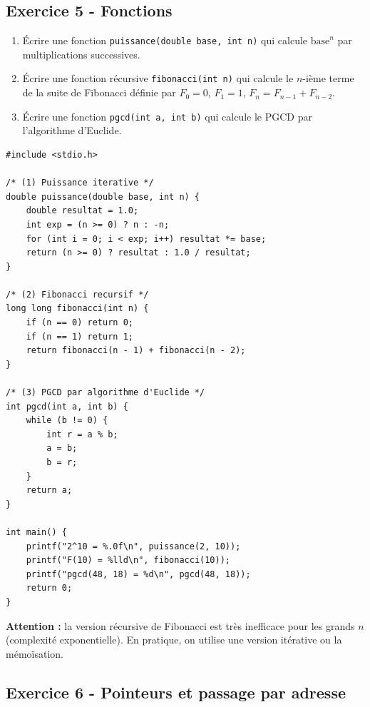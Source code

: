\documentclass[12pt,a4paper]{article}
\begin{document}
\subsection*{Exercice 5 - Fonctions \niveau{\moyen}}

\begin{boiteexercice}
\begin{enumerate}
  \item Écrire une fonction \texttt{puissance(double base, int n)} qui calcule $\text{base}^n$ par multiplications successives.
  \item Écrire une fonction récursive \texttt{fibonacci(int n)} qui calcule le $n$-ième terme de la suite de Fibonacci définie par $F_0=0$, $F_1=1$, $F_n=F_{n-1}+F_{n-2}$.
  \item Écrire une fonction \texttt{pgcd(int a, int b)} qui calcule le PGCD par l'algorithme d'Euclide.
\end{enumerate}
\end{boiteexercice}

\begin{boitecorrige}
\begin{lstlisting}
#include <stdio.h>

/* (1) Puissance iterative */
double puissance(double base, int n) {
    double resultat = 1.0;
    int exp = (n >= 0) ? n : -n;
    for (int i = 0; i < exp; i++) resultat *= base;
    return (n >= 0) ? resultat : 1.0 / resultat;
}

/* (2) Fibonacci recursif */
long long fibonacci(int n) {
    if (n == 0) return 0;
    if (n == 1) return 1;
    return fibonacci(n - 1) + fibonacci(n - 2);
}

/* (3) PGCD par algorithme d'Euclide */
int pgcd(int a, int b) {
    while (b != 0) {
        int r = a % b;
        a = b;
        b = r;
    }
    return a;
}

int main() {
    printf("2^10 = %.0f\n", puissance(2, 10));
    printf("F(10) = %lld\n", fibonacci(10));
    printf("pgcd(48, 18) = %d\n", pgcd(48, 18));
    return 0;
}
\end{lstlisting}

\textbf{Attention :} la version récursive de Fibonacci est très inefficace pour les grands $n$ (complexité exponentielle). En pratique, on utilise une version itérative ou la mémoïsation.
\end{boitecorrige}

\subsection*{Exercice 6 - Pointeurs et passage par adresse \niveau{\difficile}}
\end{document}
